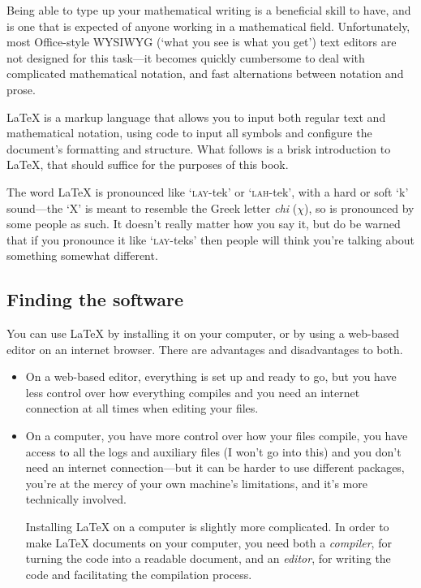 Being able to type up your mathematical writing is a beneficial skill to have, and is one that is expected of anyone working in a mathematical field. Unfortunately, most Office-style {\small WYSIWYG} (`what you see is what you get') text editors are not designed for this task---it becomes quickly cumbersome to deal with complicated mathematical notation, and fast alternations between notation and prose.

\LaTeX{} is a markup language that allows you to input both regular text and mathematical notation, using code to input all symbols and configure the document's formatting and structure. What follows is a brisk introduction to \LaTeX{}, that should suffice for the purposes of this book.

The word \LaTeX{} is pronounced like `\textsc{lay}-tek' or `\textsc{lah}-tek', with a hard or soft `k' sound---the `X' is meant to resemble the Greek letter \textit{chi} ($\chi$), so is pronounced by some people as such. It doesn't really matter how you say it, but do be warned that if you pronounce it like `\textsc{lay}-teks' then people will think you're talking about something somewhat different.

\subsection*{Finding the software}

You can use \LaTeX{} by installing it on your computer, or by using a web-based editor on an internet browser. There are advantages and disadvantages to both.

\begin{itemize}
\item On a web-based editor, everything is set up and ready to go, but you have less control over how everything compiles and you need an internet connection at all times when editing your files.
\item On a computer, you have more control over how your files compile, you have access to all the logs and auxiliary files (I won't go into this) and you don't need an internet connection---but it can be harder to use different packages, you're at the mercy of your own machine's limitations, and it's more technically involved.

Installing \LaTeX{} on a computer is slightly more complicated. In order to make \LaTeX{} documents on your computer, you need both a \textit{compiler}, for turning the code into a readable document, and an \textit{editor}, for writing the code and facilitating the compilation process.
\end{itemize}


